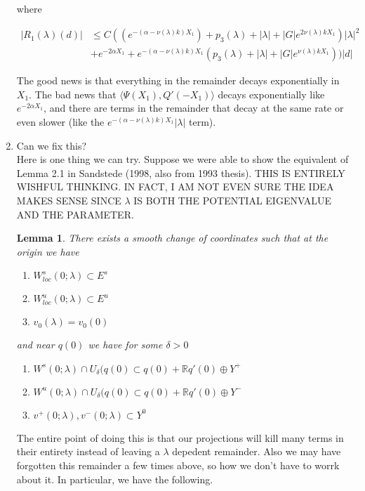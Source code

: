 \documentclass[12pt]{article}
\def\R{{\mathbb R}}
\newtheorem{lemma}{Lemma}
\begin{document}
\begin{enumerate}
where 

\begin{align*}
|R_1(\lambda)(d)| &\leq C( ( e^{-(\alpha - \nu(\lambda) k)X_1 }) + p_3(\lambda) + |\lambda| + |G|e^{2 \nu(\lambda) k X_1})|\lambda|^2 \\ 
&+ e^{-2 \alpha X_1} + e^{-(\alpha - \nu(\lambda) k)X_1 }(p_3(\lambda) + |\lambda| + |G| e^{\nu(\lambda)k X_1}))|d|
\end{align*}

The good news is that everything in the remainder decays exponentially in $X_1$. The bad news that $\langle \Psi(X_1), Q'(-X_1) \rangle$ decays exponentially like $e^{-2 \alpha X_1}$, and there are terms in the remainder that decay at the same rate or even slower (like the $e^{-(\alpha - \nu(\lambda) k)X_1 } |\lambda|$ term).

\item Can we fix this?\\

Here is one thing we can try. Suppose we were able to show the equivalent of Lemma 2.1 in Sandstede (1998, also from 1993 thesis). THIS IS ENTIRELY WISHFUL THINKING. IN FACT, I AM NOT EVEN SURE THE IDEA MAKES SENSE SINCE $\lambda$ IS BOTH THE POTENTIAL EIGENVALUE AND THE PARAMETER.

\begin{lemma}There exists a smooth change of coordinates such that at the origin we have
\begin{enumerate}
	\item $W^s_{loc}(0; \lambda) \subset E^s$
	\item $W^u_{loc}(0; \lambda) \subset E^u$
	\item $v_0(\lambda) = v_0(0)$
\end{enumerate}
and near $q(0)$ we have for some $\delta > 0$
\begin{enumerate}
	\item $W^s(0; \lambda) \cap U_\delta(q(0) \subset q(0) + \R q'(0) \oplus Y^+ $
	\item $W^u(0; \lambda) \cap U_\delta(q(0) \subset q(0) + \R q'(0) \oplus Y^- $
	\item $v^+(0; \lambda), v^-(0; \lambda) \subset Y^0$
\end{enumerate}
\end{lemma}

The entire point of doing this is that our projections will kill many terms in their entirety instead of leaving a $\lambda$ depedent remainder. Also we may have forgotten this remainder a few times above, so how we don't have to worrk about it. In particular, we have the following.


\end{enumerate}
\end{document}
